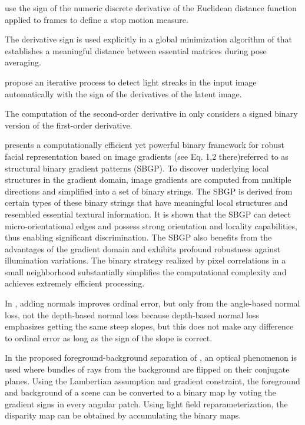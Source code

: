 \documentclass[11pt]{book}
\begin{document}
\cite{redi20146} use the sign of the numeric discrete derivative
of the Euclidean distance function applied to frames to define a stop
motion measure.

The derivative sign is used explicitly in a global minimization algorithm
of \cite{tron2014quotient} that establishes a meaningful distance
between essential matrices during pose averaging.

\cite{hu2014deblurring} propose an iterative process to detect light
streaks in the input image automatically with the sign of the derivatives
of the latent image.

The computation of the second-order derivative in \cite{yang2016shape}
only considers a signed binary version of the first-order derivative.

\cite{huang2017robust} presents a computationally efficient yet powerful
binary framework for robust facial representation based on image gradients
(see Eq. 1,2 there)referred to as structural binary gradient patterns
(SBGP). To discover underlying local structures in the gradient domain,
image gradients are computed from multiple directions and simplified
into a set of binary strings. The SBGP is derived from certain types
of these binary strings that have meaningful local structures and
resembled essential textural information. It is shown that the SBGP
can detect micro-orientational edges and possess strong orientation
and locality capabilities, thus enabling significant discrimination.
The SBGP also benefits from the advantages of the gradient domain
and exhibits profound robustness against illumination variations.
The binary strategy realized by pixel correlations in a small neighborhood
substantially simplifies the computational complexity and achieves
extremely efficient processing.

In \cite{chen2017surface}, adding normals improves ordinal error,
but only from the angle-based normal loss, not the depth-based normal
loss because depth-based normal loss emphasizes getting the same steep
slopes, but this does not make any difference to ordinal error as
long as the sign of the slope is correct.

In the proposed foreground-background separation of \cite{lee2017depth},
an optical phenomenon is used where bundles of rays from the background
are flipped on their conjugate planes. Using the Lambertian assumption
and gradient constraint, the foreground and background of a scene
can be converted to a binary map by voting the gradient signs in every
angular patch. Using light field reparameterization, the disparity
map can be obtained by accumulating the binary maps.
\end{document}
